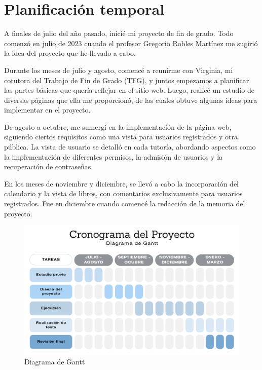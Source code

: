 \documentclass[a4paper, 12pt]{book}
\begin{document}
\section{Planificación temporal}
\label{sec:planificacion-temporal}

A finales de julio del año pasado, inicié mi proyecto de fin de grado. Todo comenzó en julio de 2023 cuando el profesor 
Gregorio Robles Martínez me sugirió la idea del proyecto que he llevado a cabo.

Durante los meses de julio y agosto, comencé a reunirme con Virginia, mi cotutora del Trabajo de Fin de Grado (TFG), 
y juntos empezamos a planificar las partes básicas que quería reflejar en el sitio web. Luego, realicé un estudio de 
diversas páginas que ella me proporcionó, de las cuales obtuve algunas ideas para implementar en el proyecto.

De agosto a octubre, me sumergí en la implementación de la página web, siguiendo ciertos requisitos como una vista para 
usuarios registrados y otra pública. La vista de usuario se detalló en cada tutoría, abordando aspectos como la implementación 
de diferentes permisos, la admisión de usuarios y la recuperación de contraseñas.

En los meses de noviembre y diciembre, se llevó a cabo la incorporación del calendario y la vista de libros, con comentarios 
exclusivamente para usuarios registrados. Fue en diciembre cuando comencé la redacción de la memoria del proyecto.
\begin{figure}
  \centering
  \includegraphics[width=15cm, keepaspectratio]{img/gann.png}
  \caption{Diagrama de Gantt}
  \label{fig:arquitectura}
\end{figure}


\end{document}
